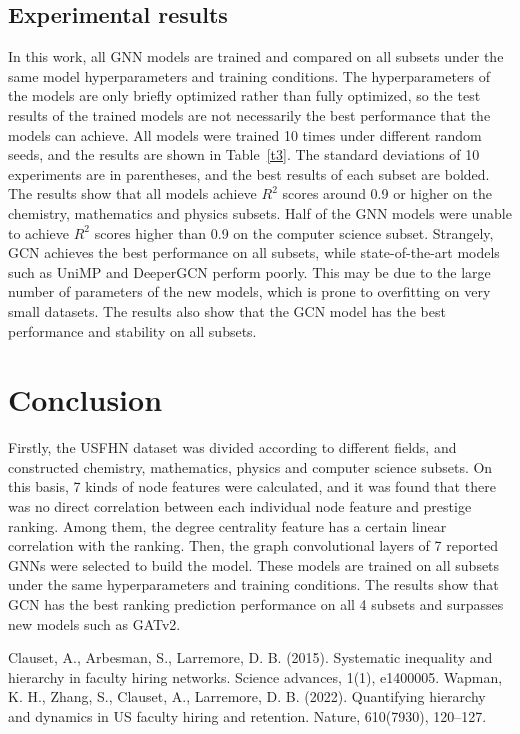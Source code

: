 \documentclass[journal]{IEEEtran}
\begin{document}
\subsection{Experimental results}
In this work, all GNN models are trained and compared on all subsets under the same model hyperparameters and training conditions. The hyperparameters of the models are only briefly optimized rather than fully optimized, so the test results of the trained models are not necessarily the best performance that the models can achieve. All models were trained 10 times under different random seeds, and the results are shown in Table~\ref{t3}. The standard deviations of 10 experiments are in parentheses, and the best results of each subset are bolded. The results show that all models achieve $R^2$ scores around 0.9 or higher on the chemistry, mathematics and physics subsets. Half of the GNN models were unable to achieve $R^2$ scores higher than 0.9 on the computer science subset. Strangely, GCN achieves the best performance on all subsets, while state-of-the-art models such as UniMP and DeeperGCN perform poorly. This may be due to the large number of parameters of the new models, which is prone to overfitting on very small datasets. The results also show that the GCN model has the best performance and stability on all subsets.


\section{Conclusion}
Firstly, the USFHN dataset was divided according to different fields, and constructed chemistry, mathematics, physics and computer science subsets. On this basis, 7 kinds of node features were calculated, and it was found that there was no direct correlation between each individual node feature and prestige ranking. Among them, the degree centrality feature has a certain linear correlation with the ranking. Then, the graph convolutional layers of 7 reported GNNs were selected to build the model. These models are trained on all subsets under the same hyperparameters and training conditions. The results show that GCN has the best ranking prediction performance on all 4 subsets and surpasses new models such as GATv2.


\begin{thebibliography}{00}
 Clauset, A., Arbesman, S., Larremore, D. B. (2015). Systematic inequality and hierarchy in faculty hiring networks. Science advances, 1(1), e1400005.
 Wapman, K. H., Zhang, S., Clauset, A., Larremore, D. B. (2022). Quantifying hierarchy and dynamics in US faculty hiring and retention. Nature, 610(7930), 120--127.
\end{thebibliography}
\end{document}
